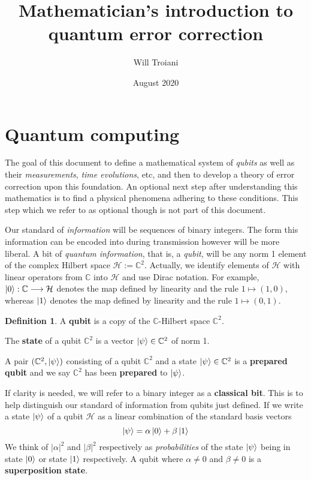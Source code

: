\documentclass[12pt]{article}
\title{Mathematician's introduction to quantum error correction}
\author{Will Troiani}
\date{August 2020}
\theoremstyle{plain}
\theoremstyle{definition}
\newtheorem{defn}[thm]{Definition} %
\newcommand{\bb}[1]{\mathbb{#1}}
\newcommand{\call}[1]{\mathcal{#1}}
\newcommand{\lto}{\longrightarrow}
\begin{document}
	
	\maketitle
	\tableofcontents
	
	\section{Quantum computing}\label{sec:quantum_computing}
	The goal of this document to define a mathematical system of \emph{qubits} as well as their \emph{measurements}, \emph{time evolutions}, etc, and then to develop a theory of error correction upon this foundation. An optional next step after understanding this mathematics is to find a physical phenomena adhering to these conditions. This step which we refer to as optional though is not part of this document.
	
	Our standard of \emph{information} will be sequences of binary integers. The form this information can be encoded into during transmission however will be more liberal. A bit of \emph{quantum information}, that is, a \emph{qubit}, will be any norm 1 element of the complex Hilbert space $\call{H} := \bb{C}^2$. Actually, we identify elements of $\call{H}$ with linear operators from $\bb{C}$ into $\call{H}$ and use Dirac notation. For example, $\ket{0}: \bb{C} \lto \call{H}$ denotes the map defined by linearity and the rule $1 \longmapsto (1,0)$, whereas $\ket{1}$ denotes the map defined by linearity and the rule $1 \longmapsto (0,1)$.
	\begin{defn}\label{def:qubit}
		A \textbf{qubit} is a copy of the $\bb{C}$-Hilbert space $\bb{C}^2$.
		
		The \textbf{state} of a qubit $\bb{C}^2$ is a vector $\ket{\psi} \in \bb{C}^2$ of norm 1.
		
		A pair $(\bb{C}^2,\ket{\psi})$ consisting of a qubit $\bb{C}^2$ and a state $\ket{\psi} \in \bb{C}^2$ is a \textbf{prepared qubit} and we say $\bb{C}^2$ has been \textbf{prepared} to $\ket{\psi}$.
		\end{defn}
	If clarity is needed, we will refer to a binary integer as a \textbf{classical bit}. This is to help distinguish our standard of information from qubits just defined. If we write a state $\ket{\psi}$ of a qubit $\call{H}$ as a linear combination of the standard basis vectors
\begin{equation}
	\ket{\psi} = \alpha\ket{0} + \beta\ket{1}
	\end{equation}
	We think of $|\alpha|^2$ and $|\beta|^2$ respectively as \emph{probabilities} of the state $\ket{\psi}$ being in state $\ket{0}$ or state $\ket{1}$ respectively. A qubit where $\alpha \neq 0$ and $\beta \neq 0$ is a \textbf{superposition state}.
	
\end{document}
